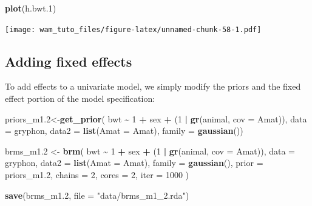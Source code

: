 \documentclass[
  12pt,
]{book}
\newenvironment{Shaded}{\begin{snugshade}}{\end{snugshade}}
\newcommand{\DataTypeTok}[1]{\textcolor[rgb]{0.13,0.29,0.53}{#1}}
\newcommand{\DecValTok}[1]{\textcolor[rgb]{0.00,0.00,0.81}{#1}}
\newcommand{\FloatTok}[1]{\textcolor[rgb]{0.00,0.00,0.81}{#1}}
\newcommand{\KeywordTok}[1]{\textcolor[rgb]{0.13,0.29,0.53}{\textbf{#1}}}
\newcommand{\NormalTok}[1]{#1}
\newcommand{\OperatorTok}[1]{\textcolor[rgb]{0.81,0.36,0.00}{\textbf{#1}}}
\newcommand{\StringTok}[1]{\textcolor[rgb]{0.31,0.60,0.02}{#1}}
\begin{document}
\begin{Shaded}
\begin{Highlighting}[]
\KeywordTok{plot}\NormalTok{(h.bwt}\FloatTok{.1}\NormalTok{)}
\end{Highlighting}
\end{Shaded}

\texttt{[image: wam\_tuto\_files/figure-latex/unnamed-chunk-58-1.pdf]}

\hypertarget{adding-fixed-effects-2}{%
\subsection{Adding fixed effects}\label{adding-fixed-effects-2}}

To add effects to a univariate model, we simply modify the priors and the fixed effect portion of the model specification:

\begin{Shaded}
\begin{Highlighting}[]
\NormalTok{priors\_m1}\FloatTok{.2}\NormalTok{\textless{}{-}}\KeywordTok{get\_prior}\NormalTok{( bwt }\OperatorTok{\textasciitilde{}}\StringTok{ }\DecValTok{1} \OperatorTok{+}\StringTok{ }\NormalTok{sex }\OperatorTok{+}\StringTok{ }\NormalTok{(}\DecValTok{1} \OperatorTok{|}\StringTok{ }\KeywordTok{gr}\NormalTok{(animal, }\DataTypeTok{cov =}\NormalTok{ Amat)),}
  \DataTypeTok{data =}\NormalTok{ gryphon,}
  \DataTypeTok{data2 =} \KeywordTok{list}\NormalTok{(}\DataTypeTok{Amat =}\NormalTok{ Amat),}
  \DataTypeTok{family =} \KeywordTok{gaussian}\NormalTok{())  }
  
\NormalTok{brms\_m1}\FloatTok{.2}\NormalTok{ \textless{}{-}}\StringTok{ }\KeywordTok{brm}\NormalTok{(}
\NormalTok{  bwt }\OperatorTok{\textasciitilde{}}\StringTok{ }\DecValTok{1} \OperatorTok{+}\StringTok{ }\NormalTok{sex }\OperatorTok{+}\StringTok{ }\NormalTok{(}\DecValTok{1} \OperatorTok{|}\StringTok{ }\KeywordTok{gr}\NormalTok{(animal, }\DataTypeTok{cov =}\NormalTok{ Amat)),}
  \DataTypeTok{data =}\NormalTok{ gryphon,}
  \DataTypeTok{data2 =} \KeywordTok{list}\NormalTok{(}\DataTypeTok{Amat =}\NormalTok{ Amat),}
  \DataTypeTok{family =} \KeywordTok{gaussian}\NormalTok{(),}
  \DataTypeTok{prior =}\NormalTok{ priors\_m1}\FloatTok{.2}\NormalTok{,}
  \DataTypeTok{chains =} \DecValTok{2}\NormalTok{, }\DataTypeTok{cores =} \DecValTok{2}\NormalTok{, }\DataTypeTok{iter =} \DecValTok{1000}
\NormalTok{)}

\KeywordTok{save}\NormalTok{(brms\_m1}\FloatTok{.2}\NormalTok{, }\DataTypeTok{file =} \StringTok{"data/brms\_m1\_2.rda"}\NormalTok{)}
\end{Highlighting}
\end{Shaded}
\end{document}
